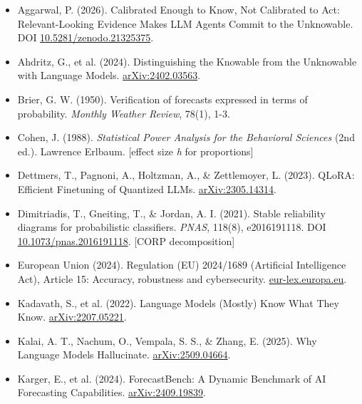 \documentclass[10pt]{article}
\begin{document}
\small
\begin{itemize}[leftmargin=1.6em,itemsep=3pt,label=\textbullet]

\item Aggarwal, P. (2026). Calibrated Enough to Know, Not Calibrated to Act: Relevant-Looking Evidence Makes LLM Agents Commit to the Unknowable. DOI \href{https://doi.org/10.5281/zenodo.21325375}{10.5281/zenodo.21325375}.

\item Ahdritz, G., et al. (2024). Distinguishing the Knowable from the Unknowable with Language Models. \href{https://arxiv.org/abs/2402.03563}{arXiv:2402.03563}.

\item Brier, G. W. (1950). Verification of forecasts expressed in terms of probability. \textit{Monthly Weather Review}, 78(1), 1-3.

\item Cohen, J. (1988). \textit{Statistical Power Analysis for the Behavioral Sciences} (2nd ed.). Lawrence Erlbaum. [effect size \textit{h} for proportions]

\item Dettmers, T., Pagnoni, A., Holtzman, A., \& Zettlemoyer, L. (2023). QLoRA: Efficient Finetuning of Quantized LLMs. \href{https://arxiv.org/abs/2305.14314}{arXiv:2305.14314}.

\item Dimitriadis, T., Gneiting, T., \& Jordan, A. I. (2021). Stable reliability diagrams for probabilistic classifiers. \textit{PNAS}, 118(8), e2016191118. DOI \href{https://doi.org/10.1073/pnas.2016191118}{10.1073/pnas.2016191118}. [CORP decomposition]

\item European Union (2024). Regulation (EU) 2024/1689 (Artificial Intelligence Act), Article 15: Accuracy, robustness and cybersecurity. \href{https://eur-lex.europa.eu/eli/reg/2024/1689/oj/eng}{eur-lex.europa.eu}.

\item Kadavath, S., et al. (2022). Language Models (Mostly) Know What They Know. \href{https://arxiv.org/abs/2207.05221}{arXiv:2207.05221}.

\item Kalai, A. T., Nachum, O., Vempala, S. S., \& Zhang, E. (2025). Why Language Models Hallucinate. \href{https://arxiv.org/abs/2509.04664}{arXiv:2509.04664}.

\item Karger, E., et al. (2024). ForecastBench: A Dynamic Benchmark of AI Forecasting Capabilities. \href{https://arxiv.org/abs/2409.19839}{arXiv:2409.19839}.


\end{itemize}
\end{document}
